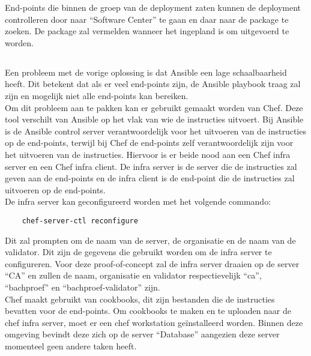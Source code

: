 End-points die binnen de groep van de deployment zaten kunnen de deployment controlleren door naar ``Software Center'' te gaan en daar naar de package te zoeken. De package zal vermelden wanneer het ingepland is om uitgevoerd te worden.

\pagebreak

\subsection{}
\label{subsec:Oplossing_voor_Linux_end-points_met_Chef_en_Vault}
Een probleem met de vorige oplossing is dat Ansible een lage schaalbaarheid heeft. Dit betekent dat als er veel end-points zijn, de Ansible playbook traag zal zijn en mogelijk niet alle end-points kan bereiken. \\

Om dit probleem aan te pakken kan er gebruikt gemaakt worden van Chef. Deze tool verschilt van Ansible op het vlak van wie de instructies uitvoert. Bij Ansible is de Ansible control server verantwoordelijk voor het uitvoeren van de instructies op de end-points, terwijl bij Chef de end-points zelf verantwoordelijk zijn voor het uitvoeren van de instructies.
Hiervoor is er beide nood aan een Chef infra server en een Chef infra client. De infra server is de server die de instructies zal geven aan de end-points en de infra client is de end-point die de instructies zal uitvoeren op de end-points. \\

De infra server kan geconfigureerd worden met het volgende commando:
\begin{verbatim}
    chef-server-ctl reconfigure
\end{verbatim}

Dit zal prompten om de naam van de server, de organisatie en de naam van de validator. Dit zijn de gegevens die gebruikt worden om de infra server te configureren.
Voor deze proof-of-concept zal de infra server draaien op de server ``CA'' en zullen de naam, organisatie en validator respectievelijk ``ca'', ``bachproef'' en ``bachproef-validator'' zijn. \\

Chef maakt gebruikt van cookbooks, dit zijn bestanden die de instructies bevatten voor de end-points. 
Om cookbooks te maken en te uploaden naar de chef infra server, moet er een chef workstation geïnstalleerd worden. Binnen deze omgeving bevindt deze zich op de server ``Database'' aangezien deze server momenteel geen andere taken heeft. \\


